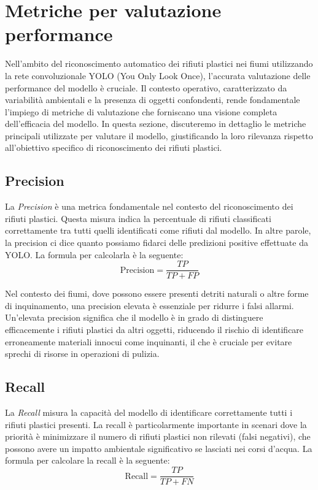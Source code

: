 \section{Metriche per valutazione performance}

Nell'ambito del riconoscimento automatico dei rifiuti plastici nei fiumi utilizzando la rete convoluzionale YOLO (You Only Look Once), l'accurata valutazione delle performance del modello è cruciale. Il contesto operativo, caratterizzato da variabilità ambientali e la presenza di oggetti confondenti, rende fondamentale l'impiego di metriche di valutazione che forniscano una visione completa dell'efficacia del modello. In questa sezione, discuteremo in dettaglio le metriche principali utilizzate per valutare il modello, giustificando la loro rilevanza rispetto all'obiettivo specifico di riconoscimento dei rifiuti plastici.

\subsection*{Precision}

La \textit{Precision} è una metrica fondamentale nel contesto del riconoscimento dei rifiuti plastici. Questa misura indica la percentuale di rifiuti classificati correttamente tra tutti quelli identificati come rifiuti dal modello. In altre parole, la precision ci dice quanto possiamo fidarci delle predizioni positive effettuate da YOLO. La formula per calcolarla è la seguente:
\begin{equation}
\text{Precision} = \frac{TP}{TP + FP}
\end{equation}

Nel contesto dei fiumi, dove possono essere presenti detriti naturali o altre forme di inquinamento, una precision elevata è essenziale per ridurre i falsi allarmi. Un'elevata precision significa che il modello è in grado di distinguere efficacemente i rifiuti plastici da altri oggetti, riducendo il rischio di identificare erroneamente materiali innocui come inquinanti, il che è cruciale per evitare sprechi di risorse in operazioni di pulizia.

\subsection*{Recall}

La \textit{Recall} misura la capacità del modello di identificare correttamente tutti i rifiuti plastici presenti. La recall è particolarmente importante in scenari dove la priorità è minimizzare il numero di rifiuti plastici non rilevati (falsi negativi), che possono avere un impatto ambientale significativo se lasciati nei corsi d'acqua. La formula per calcolare la recall è la seguente:
\begin{equation}
\text{Recall} = \frac{TP}{TP + FN}
\end{equation}

